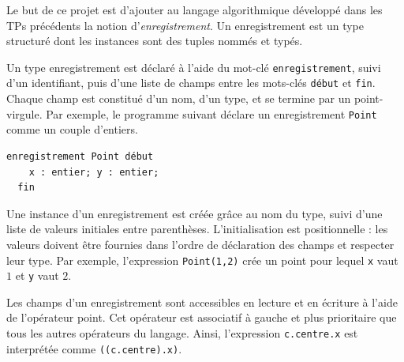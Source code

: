 \documentclass[livret]{td}
\begin{document}




\begin{abstract}
  \textbf{Remarque importante.} Ce projet n'est pas à rendre. En revanche, il constitue l'entraînement principal pour le TP noté de fin de semestre.
  L'épreuve sera un exercice d'extension similaire à réaliser en temps limité. En particulier :
  \begin{itemize}
  \item Le code de départ sera identique à celui de ce projet, à l'exception de tests spécifiques.
  \item Le TP noté est un travail strictement individuel.
  \end{itemize}
\end{abstract}


Le but de ce projet est d'ajouter au langage algorithmique développé dans les TPs précédents la notion d'\emph{enregistrement}.
Un enregistrement est un type structuré dont les instances sont des tuples nommés et typés.

Un type enregistrement est déclaré à l'aide du mot-clé \lstinline|enregistrement|, suivi d'un identifiant,
puis d'une liste de champs entre les mots-clés \lstinline|début| et \lstinline|fin|.
Chaque champ est constitué d'un nom, d'un type, et se termine par un point-virgule. Par exemple, le programme suivant déclare un enregistrement
\lstinline{Point} comme un couple d'entiers. 

\begin{lstlisting}[gobble=2]
  enregistrement Point début
    x : entier; y : entier;
  fin
\end{lstlisting}

Une instance d'un enregistrement est créée grâce au nom du type, suivi d'une liste de valeurs initiales entre parenthèses.
L'initialisation est positionnelle : les valeurs doivent être fournies dans l'ordre de déclaration des champs et respecter leur type.
Par exemple, l'expression \lstinline{Point(1,2)} crée un point pour lequel \lstinline{x} vaut $1$ et \lstinline{y} vaut $2$.

Les champs d'un enregistrement sont accessibles en lecture et en écriture à l'aide de l'opérateur point.
Cet opérateur est associatif à gauche et plus prioritaire que tous les autres opérateurs du langage.
Ainsi, l'expression \lstinline{c.centre.x} est interprétée comme \lstinline{((c.centre).x)}.
\end{document}
